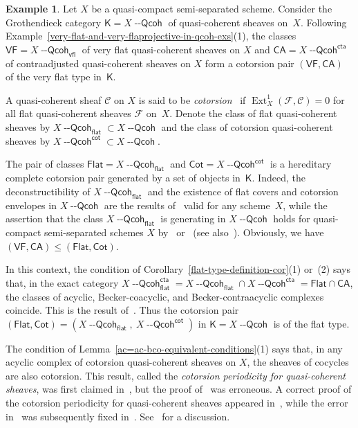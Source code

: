 \documentclass[12pt,a4paper]{amsart}
\newcommand{\+}{\nobreakdash-}
\renewcommand{\:}{\colon}
\DeclareMathOperator{\Ext}{Ext}
\newcommand{\Qcoh}{{\operatorname{\mathsf{--Qcoh}}}}
\newcommand{\sK}{\mathsf K}
\newcommand{\cF}{\mathcal F}
\newcommand{\cC}{\mathcal C}
\newcommand{\VF}{\mathsf{VF}}
\newcommand{\CA}{\mathsf{CA}}
\newcommand{\Flat}{\mathsf{Flat}}
\newcommand{\Cot}{\mathsf{Cot}}
\renewcommand{\flat}{\mathsf{flat}}
\renewcommand{\cot}{\mathsf{cot}}
\newcommand{\vfl}{\mathsf{vfl}}
\newcommand{\cta}{\mathsf{cta}}
\theoremstyle{plain}
\theoremstyle{definition}
\newtheorem{ex}[thm]{Example}
\begin{document}
\begin{ex} \label{flat-cotorsion-pair-in-qcoh-flat-type}
 Let $X$ be a quasi-compact semi-separated scheme.
 Consider the Grothendieck category $\sK=X\Qcoh$ of quasi-coherent
sheaves on~$X$.
 Following
Example~\ref{very-flat-and-very-flaprojective-in-qcoh-exs}(1),
the classes $\VF=X\Qcoh_\vfl$ of very flat quasi-coherent sheaves
on $X$ and $\CA=X\Qcoh^\cta$ of contraadjusted quasi-coherent sheaves
on $X$ form a cotorsion pair $(\VF,\CA)$ of the very flat type in~$\sK$.

 A quasi-coherent sheaf $\cC$ on $X$ is said to be
\emph{cotorsion}~\cite{EE} if $\Ext_X^1(\cF,\cC)=0$ for all flat
quasi-coherent sheaves $\cF$ on~$X$.
 Denote the class of flat quasi-coherent sheaves by $X\Qcoh_\flat
\subset X\Qcoh$ and the class of cotorsion quasi-coherent sheaves
by $X\Qcoh^\cot\subset X\Qcoh$.

 The pair of classes $\Flat=X\Qcoh_\flat$ and $\Cot=X\Qcoh^\cot$ is
a hereditary complete cotorsion pair generated by a set of objects
in~$\sK$.
 Indeed, the deconstructibility of $X\Qcoh_\flat$ and the existence
of flat covers and cotorsion envelopes in $X\Qcoh$ are the results
of~\cite[Proposition~3.3 and Corollary~4.2]{EE} valid for any
scheme~$X$, while the assertion that the class $X\Qcoh_\flat$ is
generating in $X\Qcoh$ holds for quasi-compact semi-separated
schemes $X$ by~\cite[Section~2.4]{M-n} or~\cite[Lemma~A.1]{EP}
(see also~\cite[Corollary~4.1.11]{Pcosh}).
 Obviously, we have $(\VF,\CA)\le(\Flat,\Cot)$.

 In this context, the condition of
Corollary~\ref{flat-type-definition-cor}(1) or~(2) says that,
in the exact category $X\Qcoh_\flat^\cta=X\Qcoh_\flat\cap X\Qcoh^\cta
=\Flat\cap\CA$, the classes of acyclic, Becker-coacyclic, and
Becker-contraacyclic complexes coincide.
 This is the result of~\cite[Corollary~5.5.11]{Pcosh}.
 Thus the cotorsion pair $(\Flat,\Cot)=(X\Qcoh_\flat,\>X\Qcoh^\cot)$
in $\sK=X\Qcoh$ is of the flat type.

 The condition of
Lemma~\ref{ac=ac-bco-equivalent-conditions}(1) says that, in any
acyclic complex of cotorsion quasi-coherent sheaves on $X$,
the sheaves of cocycles are also cotorsion.
 This result, called the \emph{cotorsion periodicity for quasi-coherent
sheaves}, was first claimed in~\cite[Theorem~3.3]{CET}, but
the proof of~\cite[Lemma~3.2]{CET} was erroneous.
 A correct proof of the cotorsion periodicity for quasi-coherent
sheaves appeared in~\cite[Theorem~10.2 and Corollary~10.4]{PS6},
while the error in~\cite{CET} was subsequently fixed
in~\cite[Theorem~6.3(2) and Remark~6.7]{EGilO}.
 See~\cite[Remark~10.3]{PS6} for a discussion.


\end{ex}
\end{document}
